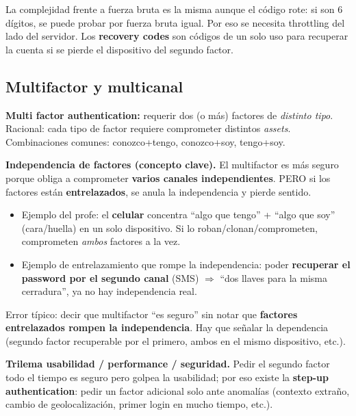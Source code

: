 \documentclass[../main.tex]{subfiles}
\begin{document}
\begin{destacado}
La complejidad frente a fuerza bruta es la misma aunque el código rote: si son 6 dígitos, se puede probar por fuerza bruta igual. Por eso se necesita throttling del lado del servidor. Los \textbf{recovery codes} son códigos de un solo uso para recuperar la cuenta si se pierde el dispositivo del segundo factor.
\end{destacado}

\subsection{Multifactor y multicanal}

\textbf{Multi factor authentication:} requerir dos (o más) factores de \emph{distinto tipo}. Racional: cada tipo de factor requiere comprometer distintos \emph{assets}. Combinaciones comunes: conozco+tengo, conozco+soy, tengo+soy.

\begin{examen}
\textbf{Independencia de factores (concepto clave).} El multifactor es más seguro porque obliga a comprometer \textbf{varios canales independientes}. PERO si los factores están \textbf{entrelazados}, se anula la independencia y pierde sentido.
\begin{itemize}[itemsep=1pt]
  \item Ejemplo del profe: el \textbf{celular} concentra ``algo que tengo'' + ``algo que soy'' (cara/huella) en un solo dispositivo. Si lo roban/clonan/comprometen, comprometen \emph{ambos} factores a la vez.
  \item Ejemplo de entrelazamiento que rompe la independencia: poder \textbf{recuperar el password por el segundo canal} (SMS) $\Rightarrow$ ``dos llaves para la misma cerradura'', ya no hay independencia real.
\end{itemize}
\end{examen}

\begin{ojo}
Error típico: decir que multifactor ``es seguro'' sin notar que \textbf{factores entrelazados rompen la independencia}. Hay que señalar la dependencia (segundo factor recuperable por el primero, ambos en el mismo dispositivo, etc.).
\end{ojo}

\begin{destacado}
\textbf{Trilema usabilidad / performance / seguridad.}  Pedir el segundo factor todo el tiempo es seguro pero golpea la usabilidad; por eso existe la \textbf{step-up authentication}: pedir un factor adicional solo ante anomalías (contexto extraño, cambio de geolocalización, primer login en mucho tiempo, etc.).
\end{destacado}
\end{document}
